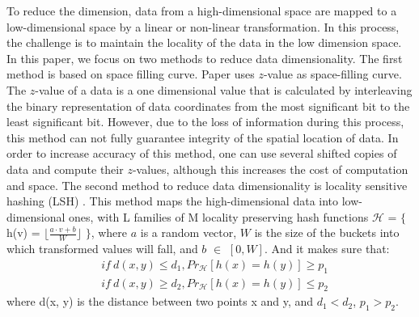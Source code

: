 To reduce the dimension, data from a high-dimensional space are mapped to a low-dimensional space by a linear or 
non-linear transformation. In 
this process, the challenge is to maintain the locality of the data in the low dimension space. In this paper, we focus 
on two methods to reduce 
data dimensionality.
The first method is based on space filling curve. Paper \cite{Zhang:2012:EPK:2247596.2247602} uses $z$-value as space-filling curve. The 
$z$-value of a data is a one dimensional value that is calculated by interleaving the binary representation of data coordinates from the most 
significant bit to the least significant bit. 
However, due to the loss of information during this process, this method can not fully guarantee integrity of the spatial location of data. 
In order to increase accuracy of this method, one can use several shifted copies of data and compute their $z$-values, although this increases the cost of computation and space. 
The second method to reduce data dimensionality is locality sensitive hashing (LSH) \cite{DBLP:conf/compgeom/2004,Datar:2004:LHS:997817.997857}. This method maps the high-dimensional data into low-dimensional ones, with L families of M locality preserving hash functions $\mathcal{H}$ = $\lbrace$ h(v) =  $\lfloor \frac{a \cdot v + b}{W}\rfloor$ $\rbrace$, where $a$ is a random vector, $W$ is the size of the buckets into which transformed values will fall, and 
$b$ $\in$ $\left[0, W\right]$. %
And it makes sure that:
\begin{eqnarray}
& if \  d(x, y) \leq d_1, Pr_\mathcal{H}\left[h(x)=h(y)\right] \geq p_1 \\
& if \  d(x, y) \geq d_2, Pr_\mathcal{H}\left[h(x)=h(y)\right] \leq p_2
\end{eqnarray}
where d(x, y) is the distance between two points x and y, and $d_1 < d_2$, $p_1 > p_2$. 

